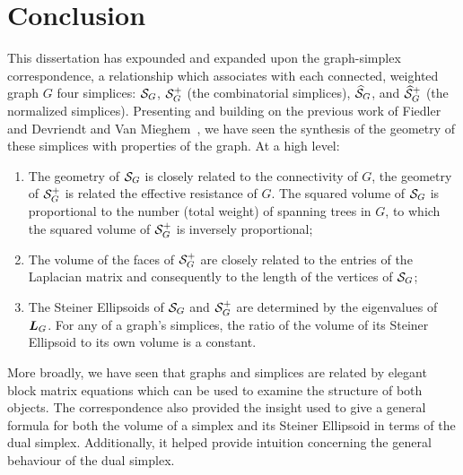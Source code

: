 \chapter{Conclusion}
\label{chap:conclusion}



This dissertation has expounded  and  expanded upon the graph-simplex correspondence, a relationship which associates with each connected, weighted graph $G$ four simplices: $\mathcal{S}_G$, $\mathcal{S}_G^+$ (the combinatorial simplices), $\widehat{\mathcal{S}}_G$, and $\widehat{\mathcal{S}}_G^+$ (the normalized simplices).  
Presenting and building on  the previous work of Fiedler~\cite{fiedler1993geometric,fiedler2011matrices} and Devriendt and Van Mieghem~\cite{devriendt2018simplex}, we have seen the synthesis of the geometry of these  simplices with properties of the graph. At a high  level: 
\begin{enumerate}
	\item The geometry of $\mathcal{S}_G$ is closely related to  the connectivity of $G$, the geometry of  $\mathcal{S}_G^+$ is related the effective resistance of $G$.  The squared volume of $\mathcal{S}_G$ is  proportional to  the number (total weight) of  spanning  trees in $G$,  to which  the  squared volume  of $\mathcal{S}_G^+$ is inversely proportional; 
	\item The volume of the faces of $\mathcal{S}_G^+$ are closely related to the entries  of the Laplacian matrix and consequently to the length of the vertices of $\mathcal{S}_G$;
	\item  The Steiner Ellipsoids of $\mathcal{S}_G$  and $\mathcal{S}_G^+$ are determined by the eigenvalues of $\vb*{L}_G$. For any of a  graph's simplices, the ratio   of the volume  of its Steiner  Ellipsoid  to its  own volume is a constant. 
\end{enumerate}
More broadly, we have seen that graphs  and simplices are related by elegant block matrix equations which can  be used to examine the structure  of both objects. The correspondence also provided the insight  used to give a general  formula  for both the volume  of a simplex and its Steiner Ellipsoid in terms of the dual simplex. Additionally, it helped provide  intuition concerning the general  behaviour of  the dual simplex. 


